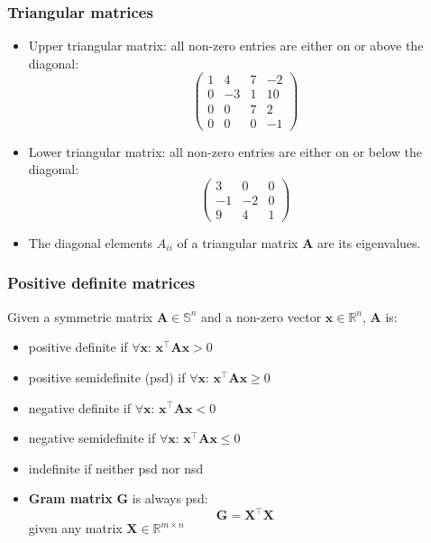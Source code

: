\documentclass[smaller]{beamer}
\newcommand{\?}{\stackrel{?}{=}}
\newcommand{\mb}{\mathbb}
\newcommand{\tr}{^{\top}}
\begin{document}
\begin{frame}
	\frametitle{Triangular matrices}
	\pause
	\begin{itemize}
		\item Upper triangular matrix: all non-zero entries are either on or
		above the diagonal:\pause
		\begin{equation*}
			\begin{pmatrix}
				1 & 4 & 7 & -2 \\
				0 & -3 & 1 & 10 \\
				0 & 0  & 7 & 2 \\
				0 & 0 & 0 & -1
			\end{pmatrix}
		\end{equation*}
		\pause
		\item Lower triangular matrix: all non-zero entries are either on or
		below the diagonal: \pause
		\begin{equation*}
			\begin{pmatrix}
				3 & 0 & 0 \\
				-1 & -2 & 0 \\
				9 & 4 & 1
			\end{pmatrix}
		\end{equation*}
		\pause
		\item The diagonal elements $A_{ii}$ of a triangular matrix $\bm A$
		are its eigenvalues.
	\end{itemize}
\end{frame}

\begin{frame}
	\frametitle{Positive definite matrices}
	\pause
	Given a symmetric matrix $\bm A \in \mb{S}^n$ and a non-zero vector
	$\bm x \in \mb{R}^n$, $\bm A$ is:
	\pause
	
	\begin{itemize}
		\item positive definite if $\forall \bm x$: $\bm x\tr\bm A\bm x > 0$
		\pause
		\item positive semidefinite (psd) if $\forall \bm x$: $\bm x\tr\bm A\bm x
		\ge 0$
		\pause
		\item negative definite if $\forall \bm x$: $\bm x\tr\bm A\bm x < 0$
		\pause
		\item negative semidefinite if $\forall \bm x$: $\bm x\tr\bm A\bm x
		\le 0$
		\pause
		\item indefinite if neither psd nor nsd\pause
		\item \textbf{Gram matrix} $\bm G$ is always psd: \pause
		\begin{equation}
			\bm G = \bm X\tr\bm X 
		\end{equation}
		given any matrix $\bm X\in\mb{R}^{m\times n}$
	\end{itemize}
\end{frame}
\end{document}
